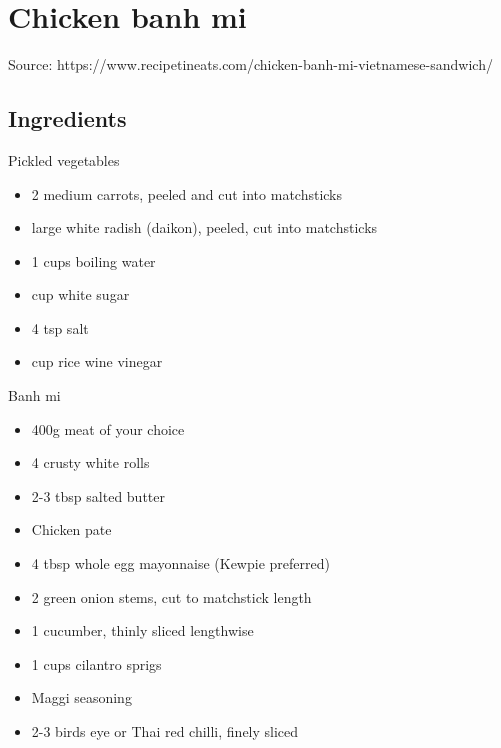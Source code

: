 \section{Chicken banh mi}


Source: https://www.recipetineats.com/chicken-banh-mi-vietnamese-sandwich/

\subsection{Ingredients}

\begin{multicols}{2}
    Pickled vegetables

    \begin{itemize}
        \item 2 medium carrots, peeled and cut into matchsticks
        \item {} large white radish (daikon), peeled, cut into matchsticks
        \item 1 cups boiling water
        \item {} cup white sugar
        \item 4 tsp salt
        \item {} cup rice wine vinegar
    \end{itemize}

    \vfill\null
    \columnbreak

    Banh mi

    \begin{itemize}
        \item 400g meat of your choice
        \item 4 crusty white rolls
        \item 2-3 tbsp salted butter
        \item Chicken pate
        \item 4 tbsp whole egg mayonnaise (Kewpie preferred)
        \item 2 green onion stems, cut to matchstick length
        \item 1 cucumber, thinly sliced lengthwise
        \item 1 cups cilantro sprigs
        \item Maggi seasoning
        \item 2-3 birds eye or Thai red chilli, finely sliced
    \end{itemize}
\end{multicols}

